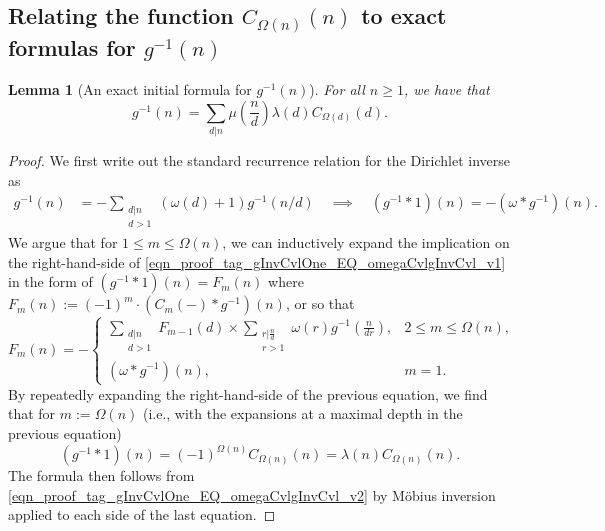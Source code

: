 \documentclass[11pt,reqno,a4letter]{article}
\numberwithin{figure}{section}
\numberwithin{table}{section}
\theoremstyle{plain}
\newtheorem{lemma}[theorem]{Lemma}
\numberwithin{theorem}{section}
\theoremstyle{definition}
\begin{document}
\subsection{Relating the function $C_{\Omega(n)}(n)$ to exact formulas for $g^{-1}(n)$} 
\label{subSection_Relating_CknFuncs_to_gInvn} 

\begin{lemma}[An exact initial formula for $g^{-1}(n)$] 
\label{lemma_AnExactFormulaFor_gInvByMobiusInv_v1} 
For all $n \geq 1$, we have that 
\[
g^{-1}(n) = \sum_{d|n} \mu\left(\frac{n}{d}\right) \lambda(d) C_{\Omega(d)}(d). 
\]
\end{lemma}
\begin{proof} 
We first write out the standard recurrence relation for the Dirichlet inverse as 
\begin{align} 
\label{eqn_proof_tag_gInvCvlOne_EQ_omegaCvlgInvCvl_v1} 
g^{-1}(n) & = - \sum_{\substack{d|n \\ d>1}} (\omega(d) + 1) g^{-1}(n/d) 
     \quad\implies\quad 
     (g^{-1} \ast 1)(n) = -(\omega \ast g^{-1})(n). 
\end{align} 
We argue that for $1 \leq m \leq \Omega(n)$, we can inductively expand the 
implication on the right-hand-side of \eqref{eqn_proof_tag_gInvCvlOne_EQ_omegaCvlgInvCvl_v1} 
in the form of $(g^{-1} \ast 1)(n) = F_m(n)$ where 
$F_m(n) := (-1)^{m} \cdot (C_m(-) \ast g^{-1})(n)$, or so that 
\[
F_m(n) = - 
     \begin{cases} 
     \sum\limits_{\substack{d|n \\ d > 1}} F_{m-1}(d) \times \sum\limits_{\substack{r|\frac{n}{d} \\ r > 1}} 
     \omega(r) g^{-1}\left(\frac{n}{dr}\right), & 2 \leq m \leq \Omega(n), \\ 
     (\omega \ast g^{-1})(n), & m = 1. 
     \end{cases} 
\]
By repeatedly expanding the right-hand-side of the previous equation, 
we find that for $m := \Omega(n)$ (i.e., with the expansions at a 
maximal depth in the previous equation) 
\begin{equation} 
\label{eqn_proof_tag_gInvCvlOne_EQ_omegaCvlgInvCvl_v2} 
(g^{-1} \ast 1)(n) = (-1)^{\Omega(n)} C_{\Omega(n)}(n) = \lambda(n) C_{\Omega(n)}(n). 
\end{equation} 
The formula then follows from \eqref{eqn_proof_tag_gInvCvlOne_EQ_omegaCvlgInvCvl_v2} 
by M\"obius inversion applied to each side of the last equation. 
\end{proof} 
\end{document}
